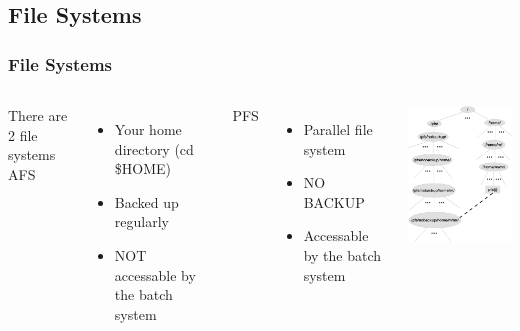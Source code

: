 %

\subsection{File Systems}

\begin{frame}
	\frametitle{File Systems}


\begin{columns}
	\column[T]{5cm}
		There are 2 file systems\\
		AFS
		\begin{itemize}
			\item	Your home directory (cd \$HOME)
			\item	Backed up regularly
			\item	NOT accessable by the batch system
		\end{itemize}
		PFS
		\begin{itemize}
			\item	Parallel file system
			\item	NO BACKUP
			\item	Accessable by the batch system
		\end{itemize}
	\column[T]{5cm}
		\vspace*{-1cm}
		\includegraphics[width=6.5cm]{images/filesystem.eps}
\end{columns}
\end{frame}

